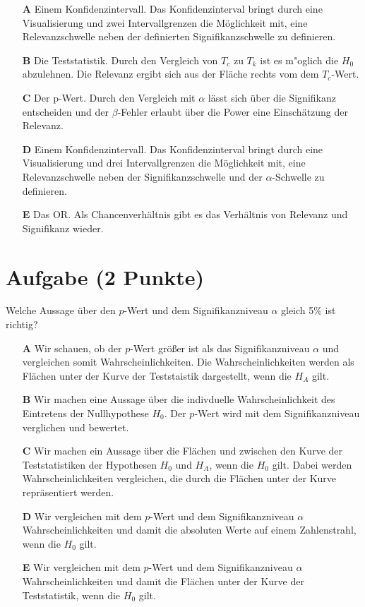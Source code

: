 \documentclass[a4paper, 9pt]{scrartcl}\usepackage[]{graphicx}\usepackage[]{xcolor}
\begin{document}
\begin{enumerate}
\item [\textbf{A} \msquare] Einem Konfidenzintervall. Das Konfidenzinterval bringt durch eine Visualisierung und zwei Intervallgrenzen die Möglichkeit mit, eine Relevanzschwelle neben der definierten Signifikanzschwelle zu definieren.
\item [\textbf{B} \msquare] Die Teststatistik. Durch den Vergleich von $T_c$ zu $T_k$ ist es m{"o}glich die $H_0$ abzulehnen. Die Relevanz ergibt sich aus der Fläche rechts vom dem $T_c$-Wert.
\item [\textbf{C} \msquare] Der p-Wert. Durch den Vergleich mit $\alpha$ lässt sich über die Signifikanz entscheiden und der $\beta$-Fehler erlaubt über die Power eine Einschätzung der Relevanz.
\item [\textbf{D} \msquare] Einem Konfidenzintervall. Das Konfidenzinterval bringt durch eine Visualisierung und drei Intervallgrenzen die Möglichkeit mit, eine Relevanzschwelle neben der Signifikanzschwelle und der $\alpha$-Schwelle zu definieren.
\item [\textbf{E} \msquare] Das OR. Als Chancenverhältnis gibt es das Verhältnis von Relevanz und Signifikanz wieder.
\end{enumerate}

\section{Aufgabe \hfill (2 Punkte)}



Welche Aussage über den $p$-Wert und dem Signifikanzniveau $\alpha$ gleich 5\% ist richtig?



\begin{enumerate}
\item [\textbf{A} \msquare] Wir schauen, ob der $p$-Wert größer ist als das Signifikanzniveau $\alpha$ und vergleichen somit Wahrscheinlichkeiten. Die Wahrscheinlichkeiten werden als Flächen unter der Kurve der Teststaistik dargestellt, wenn die $H_A$ gilt.
\item [\textbf{B} \msquare] Wir machen eine Aussage über die indivduelle Wahrscheinlichkeit des Eintretens der Nullhypothese $H_0$. Der $p$-Wert wird mit dem Signifikanzniveau verglichen und bewertet.
\item [\textbf{C} \msquare] Wir machen ein Aussage über die Flächen und zwischen den Kurve der Teststatistiken der Hypothesen $H_0$ und $H_A$, wenn die $H_0$ gilt. Dabei werden Wahrscheinlichkeiten vergleichen, die durch die Flächen unter der Kurve repräsentiert werden.
\item [\textbf{D} \msquare] Wir vergleichen mit dem $p$-Wert und dem Signifikanzniveau $\alpha$ Wahrscheinlichkeiten und damit die absoluten Werte auf einem Zahlenstrahl, wenn die $H_0$ gilt.
\item [\textbf{E} \msquare] Wir vergleichen mit dem $p$-Wert und dem Signifikanzniveau $\alpha$ Wahrscheinlichkeiten und damit die Flächen unter der Kurve der Teststatistik, wenn die $H_0$ gilt.
\end{enumerate}
\end{document}
